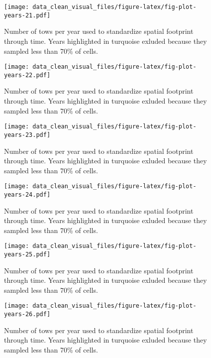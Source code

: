\documentclass[
]{article}
\begin{document}
\begin{figure}
\centering
\texttt{[image: data\_clean\_visual\_files/figure-latex/fig-plot-years-21.pdf]}
\caption{\label{fig:fig-plot-years-21}Number of tows per year used to standardize spatial footprint through time. Years highlighted in turquoise exluded because they sampled less than 70\% of cells.}
\end{figure}

\begin{figure}
\centering
\texttt{[image: data\_clean\_visual\_files/figure-latex/fig-plot-years-22.pdf]}
\caption{\label{fig:fig-plot-years-22}Number of tows per year used to standardize spatial footprint through time. Years highlighted in turquoise exluded because they sampled less than 70\% of cells.}
\end{figure}

\begin{figure}
\centering
\texttt{[image: data\_clean\_visual\_files/figure-latex/fig-plot-years-23.pdf]}
\caption{\label{fig:fig-plot-years-23}Number of tows per year used to standardize spatial footprint through time. Years highlighted in turquoise exluded because they sampled less than 70\% of cells.}
\end{figure}

\begin{figure}
\centering
\texttt{[image: data\_clean\_visual\_files/figure-latex/fig-plot-years-24.pdf]}
\caption{\label{fig:fig-plot-years-24}Number of tows per year used to standardize spatial footprint through time. Years highlighted in turquoise exluded because they sampled less than 70\% of cells.}
\end{figure}

\begin{figure}
\centering
\texttt{[image: data\_clean\_visual\_files/figure-latex/fig-plot-years-25.pdf]}
\caption{\label{fig:fig-plot-years-25}Number of tows per year used to standardize spatial footprint through time. Years highlighted in turquoise exluded because they sampled less than 70\% of cells.}
\end{figure}

\begin{figure}
\centering
\texttt{[image: data\_clean\_visual\_files/figure-latex/fig-plot-years-26.pdf]}
\caption{\label{fig:fig-plot-years-26}Number of tows per year used to standardize spatial footprint through time. Years highlighted in turquoise exluded because they sampled less than 70\% of cells.}
\end{figure}
\end{document}
